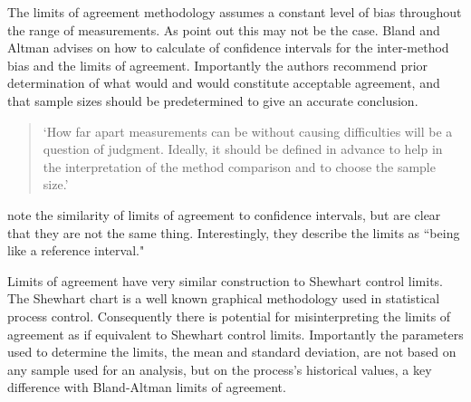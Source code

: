 \documentclass[Main.tex]{subfiles}
\begin{document}
	
	The limits of agreement methodology assumes a constant level of
	bias throughout the range of measurements. As \citet*{BA86} point
	out this may not be the case. Bland and Altman advises on how to
	calculate of confidence intervals for the inter-method bias and
	the limits of agreement. Importantly the authors recommend prior
	determination of what would and would constitute acceptable
	agreement, and that sample sizes should be predetermined to give
	an accurate conclusion.
	
	\begin{quote}
		`How far apart measurements can be without causing difficulties
		will be a question of judgment. Ideally, it should be defined in
		advance to help in the interpretation of the method comparison and
		to choose the sample size.'\citep{BA86}
	\end{quote}
	
	\citet{BA99} note the similarity of limits of agreement to
	confidence intervals, but are clear that they are not the same
	thing. Interestingly, they describe the limits as ``being like a
	reference interval."
	
	Limits of agreement have very similar construction to Shewhart
	control limits. The Shewhart chart is a well known graphical
	methodology used in statistical process control. Consequently
	there is potential for misinterpreting the limits of agreement as
	if equivalent to Shewhart control limits. Importantly the
	parameters used to determine the limits, the mean and standard
	deviation, are not based on any sample used for an analysis, but
	on the process's historical values, a key difference with
	Bland-Altman limits of agreement.
	
\end{document}
